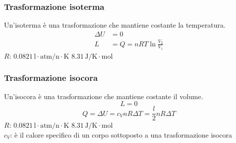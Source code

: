 \subsubsection{Trasformazione isoterma}
Un'isoterma è una trasformazione che mantiene costante la temperatura.
\begin{align*}
  \Delta U &= 0\\
  L &= Q = nRT\ln\frac{V_2}{V_1}
\end{align*}
\hyperref[tab:R]{$R$}: $0.0821\,\text{l}\cdot\text{atm/n}\cdot\text{K}$
$8.31\,\text{J/K}\cdot\text{mol}$\\

\subsubsection{Trasformazione isocora}
Un'isocora è una trasformazione che mantiene costante il volume.
\begin{equation*}
  L = 0
\end{equation*}
\begin{equation*}
  Q = \Delta U = c_VnR\Delta T =\frac{l}{2}nR\Delta T
\end{equation*}
\hyperref[tab:R]{$R$}: $0.0821\,\text{l}\cdot\text{atm/n}\cdot\text{K}$
$8.31\,\text{J/K}\cdot\text{mol}$\\
$c_V$: è il calore specifico di un corpo sottoposto a una trasformazione isocora


